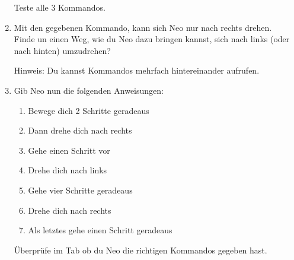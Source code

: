 \begin{enumerate}
        Teste alle 3 Kommandos.\\
    \item Mit den gegebenen Kommando, kann sich Neo nur nach rechts drehen.\\
        Finde un einen Weg, wie du Neo dazu bringen kannst, sich nach links (oder nach hinten) umzudrehen?

        Hinweis: Du kannst Kommandos mehrfach hintereinander aufrufen.
    \item Gib Neo nun die folgenden Anweisungen:
        
        {
            \begin{enumerate}
                \item Bewege dich 2 Schritte geradeaus
                \item Dann drehe dich nach rechts
                \item Gehe einen Schritt vor
                \item Drehe dich nach links
                \item Gehe vier Schritte geradeaus
                \item Drehe dich nach rechts
                \item Als letztes gehe einen Schritt geradeaus
            \end{enumerate}
        }

        Überprüfe im  Tab ob du Neo die richtigen Kommandos gegeben hast.
\end{enumerate}

